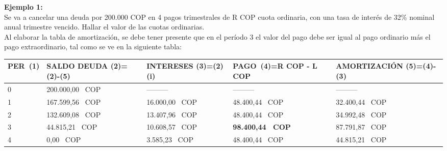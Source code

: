 \textbf{Ejemplo 1:}\\

Se va a cancelar una deuda por 200.000 COP en 4 pagos trimestrales de R COP cuota ordinaria, con una tasa de interés de 32\% nominal anual trimestre vencido. Hallar el valor de las cuotas ordinarias.\\





Al elaborar la tabla de amortización, se debe tener presente que en el período 3 el valor del pago debe ser igual al pago ordinario más el pago extraordinario, tal como se ve en la siguiente tabla:\\


\begin{spacing}{1.1}
    \footnotesize
	\begin{tabular}{|p{1cm}|p{3cm}|p{3cm}|p{3cm}|p{3cm}|}
		\hline
		\textbf{PER\ (1)} & \textbf{SALDO DEUDA (2)=(2)-(5)} & \textbf{INTERESES  (3)=(2)(i)} & \textbf{PAGO\ (4)=R COP - L COP} & \textbf{AMORTIZACIÓN  (5)=(4)-(3)} \\ \hline                    0 &   200.000,00 \ COP & --------- & --------- & ---------\\ \hline
		1                 &  167.599,56 \ COP                     &  16.000,00 \ COP                    &   48.400,44 \ COP                &  32.400,44 \ COP                        \\ \hline
		2                 &  132.609,08 \ COP                     &   13.407,96 \ COP                    &   48.400,44 \ COP                 &  34.992,48 \ COP                        \\ \hline
		3                 &  44.815,21 \ COP                      &  10.608,57 \ COP                     &  \textbf{98.400,44 \ COP }                  &  87.791,87 \ COP                        \\ \hline
		4                 &  0,00 \ COP                           &  3.585,23 \ COP                      &   48.400,44 \ COP                &  44.815,21 \ COP                        \\ \hline
	\end{tabular}
\end{spacing}

